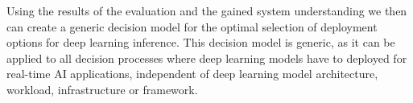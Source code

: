 Using the results of the evaluation and the gained system understanding we then can create a generic decision model for the optimal selection of deployment options for deep learning inference.
This decision model is generic, as it can be applied to all decision processes where deep learning models have to deployed for real-time AI applications,  independent of deep learning model architecture, workload, infrastructure or framework.














\endinput 